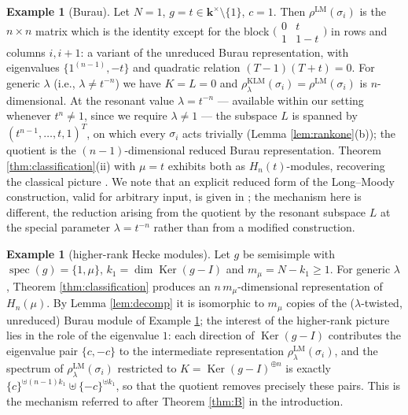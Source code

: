 \documentclass[11pt]{article}
\theoremstyle{definition}
\newtheorem{example}[theorem]{Example}
\theoremstyle{remark}
\newcommand{\Ker}{\operatorname{Ker}}
\newcommand{\spec}{\operatorname{spec}}
\newcommand{\kk}{\boldsymbol{k}}
\newcommand{\rLM}{\rho^{\mathrm{LM}}}
\newcommand{\rLMl}{\rho^{\mathrm{LM}}_{\lambda}}
\newcommand{\rKLM}{\rho^{\mathrm{KLM}}_{\lambda}}
\begin{document}
\begin{example}[Burau]\label{ex:burau}
Let $N = 1$, $g = t \in \kk^{\times}\setminus\{1\}$, $c = 1$. Then
$\rLM(\sigma_i)$ is the $n \times n$ matrix which is the identity except
for the block
$\bigl(\begin{smallmatrix} 0 & t \\ 1 & 1 - t\end{smallmatrix}\bigr)$
in rows and columns $i, i+1$: a variant of the unreduced Burau
representation, with eigenvalues $\{1^{(n-1)}, -t\}$ and quadratic
relation $(T - 1)(T + t) = 0$. For generic $\lambda$ (i.e.,
$\lambda \neq t^{-n}$) we have $K = L = 0$ and
$\rKLM(\sigma_i) = \rLM(\sigma_i)$ is $n$-dimensional. At the resonant
value $\lambda = t^{-n}$ --- available within our setting whenever
$t^{n} \neq 1$, since we require $\lambda \neq 1$ --- the subspace $L$
is spanned by
$(t^{n-1}, \dots, t, 1)^{T}$, on which every $\sigma_i$ acts trivially
(Lemma \ref{lem:rankone}(b)); the quotient is the $(n-1)$-dimensional
reduced Burau representation. Theorem \ref{thm:classification}(ii) with
$\mu = t$ exhibits both as $H_n(t)$-modules, recovering the classical
picture \cite{Jones87}. We note that an explicit reduced form
of the Long--Moody construction, valid for arbitrary input, is given in
\cite[Section 6]{BigelowTian08}; the mechanism here is different, the
reduction arising from the quotient by the resonant subspace $L$ at the
special parameter $\lambda = t^{-n}$ rather than from a modified
construction.
\end{example}

\begin{example}[higher-rank Hecke modules]\label{ex:higher}
Let $g$ be semisimple with $\spec(g) = \{1, \mu\}$, $k_1 = \dim \Ker(g - I)$ and
$m_{\mu} = N - k_1 \geq 1$. For generic $\lambda$, Theorem
\ref{thm:classification} produces an $n\,m_{\mu}$-dimensional
representation of $H_n(\mu)$. By Lemma \ref{lem:decomp} it is isomorphic
to $m_{\mu}$ copies of the ($\lambda$-twisted, unreduced) Burau module of
Example \ref{ex:burau}; the interest of the higher-rank picture lies in
the role of the eigenvalue $1$: each direction of $\Ker(g - I)$ contributes the
eigenvalue pair $\{c, -c\}$ to the intermediate representation
$\rLMl(\sigma_i)$, and the spectrum of $\rLMl(\sigma_i)$ restricted to
$K = \Ker(g - I)^{\oplus n}$ is exactly $\{c\}^{\uplus (n-1)k_1} \uplus
\{-c\}^{\uplus k_1}$, so that the quotient removes precisely these pairs.
This is the mechanism referred to after Theorem \ref{thm:B} in the
introduction.
\end{example}
\end{document}
